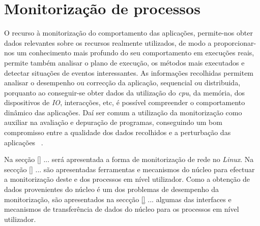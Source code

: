 \chapter{Monitorização de processos}
\label{cap:trabrelacionado}
O recurso à monitorização do comportamento das aplicações, permite-nos obter dados relevantes sobre os recursos realmente utilizados, de modo a proporcionar-nos um conhecimento mais profundo do seu comportamento em execuções reais, permite também analisar o plano de execução, os métodos mais executados e detectar situações de eventos interessantes.
As informações recolhidas permitem analisar o desempenho ou correcção da aplicação, sequencial ou distribuida, porquanto ao conseguir-se obter dados da utilização do \textit{cpu}, da memória, dos dispositivos de \textit{IO}, interacções, etc, é possível compreender o comportamento dinâmico das aplicações.
Daí ser comum a utilização da monitorização como auxiliar na avaliação e depuração de programas, conseguindo um bom compromisso entre a qualidade dos dados recolhidos e a perturbação das aplicações ~\cite{DuartePhd05}.
 
Na secção \ref{} ... será apresentada a forma de monitorização de rede no \textit{Linux}.
Na seccção \ref{} ... são apresentadas ferramentas e mecanismos do núcleo para efectuar a monitorização deste e dos processos em nível utilizador.
Como a obtenção de dados provenientes do núcleo é um dos problemas de desempenho da monitorização, são apresentados na seccção \ref{} ... algumas das interfaces e mecanismos de transferência de dados do núcleo para os processos em nível utilizador.

 


